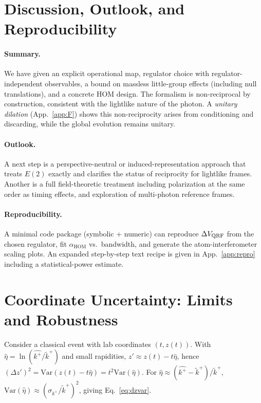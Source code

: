 \documentclass[aps,11pt]{article}
\newcommand{\Var}{\mathrm{Var}}
\newcommand{\kplus}{k^{+}}
\newcommand{\ktil}{\tilde{k}^{+}}
\newcommand{\alphahom}{\alpha_{\text{HOM}}}
\begin{document}
\section{Discussion, Outlook, and Reproducibility}\label{sec:discussion}
\paragraph{Summary.} We have given an explicit operational map, regulator choice with regulator-independent observables, a bound on massless little-group effects (including null translations), and a concrete HOM design. The formalism is non-reciprocal by construction, consistent with the lightlike nature of the photon. A \emph{unitary dilation} (App.~\ref{app:F}) shows this non-reciprocity arises from conditioning and discarding, while the global evolution remains unitary.

\paragraph{Outlook.} A next step is a perspective-neutral or induced-representation approach that treats \(E(2)\) exactly and clarifies the status of reciprocity for lightlike frames. Another is a full field-theoretic treatment including polarization at the same order as timing effects, and exploration of multi-photon reference frames.

\paragraph{Reproducibility.} A minimal code package (symbolic + numeric) can reproduce \(\Delta V_{\rm QRF}\) from the chosen regulator, fit \(\alphahom\) vs.~bandwidth, and generate the atom-interferometer scaling plots. An expanded step-by-step text recipe is given in App.~\ref{app:repro} including a statistical-power estimate.

\appendix

\section{Coordinate Uncertainty: Limits and Robustness}\label{app:A}
Consider a classical event with lab coordinates \((t,z(t))\). With \(\hat\eta=\ln(\hat{\kplus}/\ktil)\) and small rapidities,
\(z'\approx z(t)-t\hat\eta\), hence
\((\Delta z')^2=\Var(z(t)-t\hat\eta)=t^2\Var(\hat\eta)\).
For \(\hat\eta\approx (\hat{\kplus}-\ktil)/\ktil\), \(\Var(\hat\eta)\approx (\sigma_{\kplus}/\ktil)^{2}\), giving Eq.~\eqref{eq:dzvar}.
\end{document}

